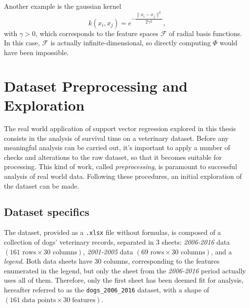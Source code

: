 \documentclass[12pt]{report}
\begin{document}
Another example is the gaussian kernel
\begin{equation} \label{gausskernel}
k(x_{i},x_{j}) = e^{-\dfrac{\| x_{i}-x_{j} \|^{2}}{2\gamma^{2}}} \text{,}
\end{equation}
with $ \gamma > 0 $, which corresponds to the feature spaces $ \mathcal{F} $ of radial basis functions. In this case, $ \mathcal{F} $ is actually infinite-dimensional, so directly computing $ \Phi $ would have been impossible.

\chapter{Dataset Preprocessing and Exploration}
\label{chprepr}
The real world application of support vector regression explored in this thesis consists in the analysis of survival time on a veterinary dataset. Before any meaningful analysis can be carried out, it's important to apply a number of checks and alterations to the raw dataset, so that it becomes suitable for processing. This kind of work, called \textit{preprocessing}, is paramount to successful analysis of real world data. Following these procedures, an initial exploration of the dataset can be made.

\section{Dataset specifics}
The dataset, provided as a \texttt{.xlsx} file without formulas, is composed of a collection of dogs' veterinary records, separated in 3 sheets: \textit{2006-2016} data $ (161 \text{ rows} \times 30 \text{ columns}) $, \textit{2001-2005} data $ (69 \text{ rows} \times 30 \text{ columns}) $, and a \textit{legend}. Both data sheets have 30 columns, corresponding to the features enumerated in the legend, but only the sheet from the \textit{2006-2016} period actually uses all of them. Therefore, only the first sheet has been deemed fit for analysis, hereafter referred to as the \texttt{dogs\_2006\_2016} dataset, with a shape of $ (161\; \text{data points} \times 30\; \text{features}) $.
\end{document}
